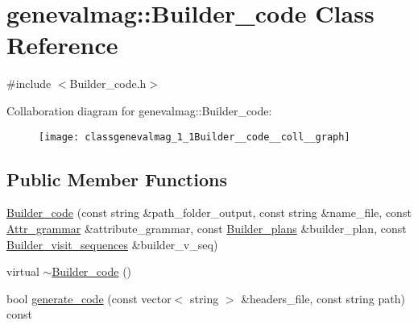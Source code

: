 \hypertarget{classgenevalmag_1_1Builder__code}{
\section{genevalmag::Builder\_\-code Class Reference}
\label{classgenevalmag_1_1Builder__code}
}


{\ttfamily \#include $<$Builder\_\-code.h$>$}



Collaboration diagram for genevalmag::Builder\_\-code:\nopagebreak
\begin{figure}[H]
\begin{center}
\leavevmode
\texttt{[image: classgenevalmag\_1\_1Builder\_\_code\_\_coll\_\_graph]}
\end{center}
\end{figure}
\subsection*{Public Member Functions}
\begin{DoxyCompactItemize}
\item 
\hyperlink{classgenevalmag_1_1Builder__code_a0d3743b15ad07d8e8cbe40a8fece97bf}{Builder\_\-code} (const string \&path\_\-folder\_\-output, const string \&name\_\-file, const \hyperlink{classgenevalmag_1_1Attr__grammar}{Attr\_\-grammar} \&attribute\_\-grammar, const \hyperlink{classgenevalmag_1_1Builder__plans}{Builder\_\-plans} \&builder\_\-plan, const \hyperlink{classgenevalmag_1_1Builder__visit__sequences}{Builder\_\-visit\_\-sequences} \&builder\_\-v\_\-seq)
\item 
virtual \hyperlink{classgenevalmag_1_1Builder__code_a9e6e4ec3399e378cc691e69d7ab5c278}{$\sim$Builder\_\-code} ()
\item 
bool \hyperlink{classgenevalmag_1_1Builder__code_a91fc24c7f3a5f9234cbb6c6497a31351}{generate\_\-code} (const vector$<$ string $>$ \&headers\_\-file, const string path) const 
\end{DoxyCompactItemize}
